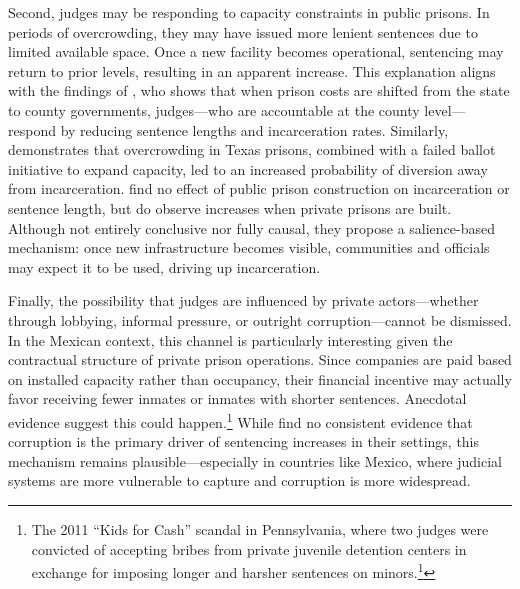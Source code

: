 Second, judges may be responding to capacity constraints in public prisons. In periods of overcrowding, they may have issued more lenient sentences due to limited available space. Once a new facility becomes operational, sentencing may return to prior levels, resulting in an apparent increase. This explanation aligns with the findings of \cite{Ouss-Incentives}, who shows that when prison costs are shifted from the state to county governments, judges—who are accountable at the county level—respond by reducing sentence lengths and incarceration rates. Similarly, \cite{Schnepel} demonstrates that overcrowding in Texas prisons, combined with a failed ballot initiative to expand capacity, led to an increased probability of diversion away from incarceration. \cite{Dippel} find no effect of public prison construction on incarceration or sentence length, but do observe increases when private prisons are built. Although not entirely conclusive nor fully causal, they propose a salience-based mechanism: once new infrastructure becomes visible, communities and officials may expect it to be used, driving up incarceration.

Finally, the possibility that judges are influenced by private actors—whether through lobbying, informal pressure, or outright corruption—cannot be dismissed. In the Mexican context, this channel is particularly interesting given the contractual structure of private prison operations. Since companies are paid based on installed capacity rather than occupancy, their financial incentive may actually favor receiving fewer inmates or inmates with shorter sentences. Anecdotal evidence suggest this could happen.\footnote{The 2011 “Kids for Cash” scandal in Pennsylvania, where two judges were convicted of accepting bribes from private juvenile detention centers in exchange for imposing longer and harsher sentences on minors.\footnote{See: \href{https://jlc.org/luzerne-kids-cash-scandal}{Juvenile Law Center}}} While \cite{Galinato-2020, Dippel} find no consistent evidence that corruption is the primary driver of sentencing increases in their settings, this mechanism remains plausible—especially in countries like Mexico, where judicial systems are more vulnerable to capture and corruption is more widespread.